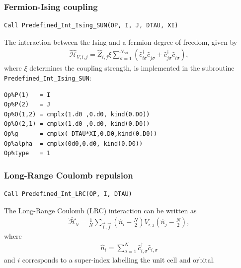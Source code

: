 \subsubsection{Fermion-Ising coupling}

\begin{lstlisting}[style=fortran]
Call Predefined_Int_Ising_SUN(OP, I, J, DTAU, XI)
\end{lstlisting}

The interaction between the Ising and a fermion degree of freedom, given by
\begin{align}
\hat{\mathcal{H}}_{V,i,j} =
\hat{Z}_{i,j} \xi  \sum_{\sigma=1}^{N_\mathrm{col}}\left( \hat{c}^{\dagger}_{i \sigma} \hat{c}^{\phantom\dagger}_{j \sigma} + \hat{c}^{\dagger}_{j \sigma} \hat{c}^{\phantom\dagger}_{i \sigma} \right),
\end{align} 
where $\xi$ determines the coupling strength, is implemented in the subroutine \texttt{Predefined\_Int\_Ising\_SUN}:
\begin{lstlisting}[style=fortran,ndkeywords={type},ndkeywordstyle=\color{black}\ttfamily]
Op%P(1)   = I
Op%P(2)   = J
Op%O(1,2) = cmplx(1.d0 ,0.d0, kind(0.D0)) 
Op%O(2,1) = cmplx(1.d0 ,0.d0, kind(0.D0)) 
Op%g      = cmplx(-DTAU*XI,0.D0,kind(0.D0))
Op%alpha  = cmplx(0d0,0.d0, kind(0.D0)) 
Op%type   = 1

\end{lstlisting}



\subsubsection{Long-Range Coulomb repulsion}

\begin{lstlisting}[style=fortran]
Call Predefined_Int_LRC(OP, I, DTAU)
\end{lstlisting}

The Long-Range Coulomb (LRC) interaction can be written as
\begin{align}
\hat{\mathcal{H}}_{V} =
\frac{1} { N } \sum_{\vec{i},\vec{j}}  \left(  \hat{n}_{i} -  \frac{N}{2}  \right)  V_{i,j} \left(  \hat{n}_{j} -  \frac{N}{2}  \right), 
\end{align} 
where
\begin{align}
\hat{n}_{i} = \sum_{\sigma=1}^{N}  \hat{c}^{\dagger}_{i,\sigma}  \hat{c}^{}_{i,\sigma}
\end{align} 
and  $i$ corresponds to a super-index labelling  the unit cell and orbital. 



